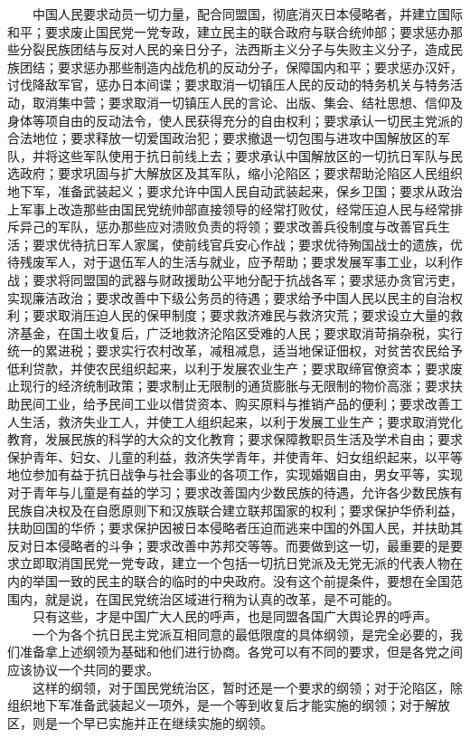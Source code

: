 \documentclass[cn,11pt,chinese]{elegantbook}
\begin{document}
　　中国人民要求动员一切力量，配合同盟国，彻底消灭日本侵略者，并建立国际和平；要求废止国民党一党专政，建立民主的联合政府与联合统帅部；要求惩办那些分裂民族团结与反对人民的亲日分子，法西斯主义分子与失败主义分子，造成民族团结；要求惩办那些制造内战危机的反动分子，保障国内和平；要求惩办汉奸，讨伐降敌军官，惩办日本间谍；要求取消一切镇压人民的反动的特务机关与特务活动，取消集中营；要求取消一切镇压人民的言论、出版、集会、结社思想、信仰及身体等项自由的反动法令，使人民获得充分的自由权利；要求承认一切民主党派的合法地位；要求释放一切爱国政治犯；要求撤退一切包围与进攻中国解放区的军队，并将这些军队使用于抗日前线上去；要求承认中国解放区的一切抗日军队与民选政府；要求巩固与扩大解放区及其军队，缩小沦陷区；要求帮助沦陷区人民组织地下军，准备武装起义；要求允许中国人民自动武装起来，保乡卫国；要求从政治上军事上改造那些由国民党统帅部直接领导的经常打败仗，经常压迫人民与经常排斥异己的军队，惩办那些应对溃败负责的将领；要求改善兵役制度与改善官兵生活；要求优待抗日军人家属，使前线官兵安心作战；要求优待殉国战士的遗族，优待残废军人，对于退伍军人的生活与就业，应予帮助；要求发展军事工业，以利作战；要求将同盟国的武器与财政援助公平地分配于抗战各军；要求惩办贪官污吏，实现廉洁政治；要求改善中下级公务员的待遇；要求给予中国人民以民主的自治权利；要求取消压迫人民的保甲制度；要求救济难民与救济灾荒；要求设立大量的救济基金，在国土收复后，广泛地救济沦陷区受难的人民；要求取消苛捐杂税，实行统一的累进税；要求实行农村改革，减租减息，适当地保证佃权，对贫苦农民给予低利贷款，并使农民组织起来，以利于发展农业生产；要求取缔官僚资本；要求废止现行的经济统制政策；要求制止无限制的通货膨胀与无限制的物价高涨；要求扶助民间工业，给予民间工业以借贷资本、购买原料与推销产品的便利；要求改善工人生活，救济失业工人，并使工人组织起来，以利于发展工业生产；要求取消党化教育，发展民族的科学的大众的文化教育；要求保障教职员生活及学术自由；要求保护青年、妇女、儿童的利益，救济失学青年，并使青年、妇女组织起来，以平等地位参加有益于抗日战争与社会事业的各项工作，实现婚姻自由，男女平等，实现对于青年与儿童是有益的学习；要求改善国内少数民族的待遇，允许各少数民族有民族自决权及在自愿原则下和汉族联合建立联邦国家的权利；要求保护华侨利益，扶助回国的华侨；要求保护因被日本侵略者压迫而逃来中国的外国人民，并扶助其反对日本侵略者的斗争；要求改善中苏邦交等等。而要做到这一切，最重要的是要求立即取消国民党一党专政，建立一个包括一切抗日党派及无党无派的代表人物在内的举国一致的民主的联合的临时的中央政府。没有这个前提条件，要想在全国范围内，就是说，在国民党统治区域进行稍为认真的改革，是不可能的。\\
　　只有这些，才是中国广大人民的呼声，也是同盟各国广大舆论界的呼声。\\
　　一个为各个抗日民主党派互相同意的最低限度的具体纲领，是完全必要的，我们准备拿上述纲领为基础和他们进行协商。各党可以有不同的要求，但是各党之间应该协议一个共同的要求。\\
　　这样的纲领，对于国民党统治区，暂时还是一个要求的纲领；对于沦陷区，除组织地下军准备武装起义一项外，是一个等到收复后才能实施的纲领；对于解放区，则是一个早已实施并正在继续实施的纲领。\\
\end{document}
